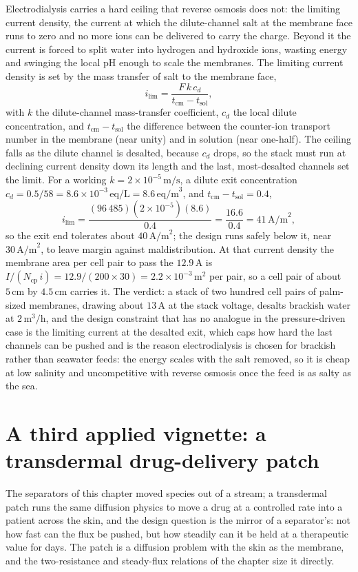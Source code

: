 Electrodialysis carries a hard ceiling that reverse osmosis does not: the
limiting current density, the current at which the dilute-channel salt at the
membrane face runs to zero and no more ions can be delivered to carry the
charge. Beyond it the current is forced to split water into hydrogen and
hydroxide ions, wasting energy and swinging the local pH enough to scale the
membranes. The limiting current density is set by the mass transfer of salt
to the membrane face,
\[
i_{\text{lim}} = \frac{F\,k\,c_d}{t_{\text{cm}} - t_{\text{sol}}},
\]
with $k$ the dilute-channel mass-transfer coefficient, $c_d$ the local
dilute concentration, and $t_{\text{cm}} - t_{\text{sol}}$ the difference
between the counter-ion transport number in the membrane (near unity) and in
solution (near one-half). The ceiling falls as the dilute channel is
desalted, because $c_d$ drops, so the stack must run at declining current
density down its length and the last, most-desalted channels set the limit.
For a working $k = 2\times 10^{-5}\,\text{m/s}$, a dilute exit concentration
$c_d = 0.5/58 = 8.6\times 10^{-3}\,\text{eq/L} = 8.6\,\text{eq/m}^3$, and
$t_{\text{cm}} - t_{\text{sol}} = 0.4$,
\[
i_{\text{lim}} = \frac{(96\,485)(2\times 10^{-5})(8.6)}{0.4} =
\frac{16.6}{0.4} = 41\,\text{A/m}^2,
\]
so the exit end tolerates about $40\,\text{A/m}^2$; the design runs safely
below it, near $30\,\text{A/m}^2$, to leave margin against maldistribution.
At that current density the membrane area per cell pair to pass the
$12.9\,\text{A}$ is $I/(N_{\text{cp}}\,i) = 12.9/(200 \times 30) = 2.2\times
10^{-3}\,\text{m}^2$ per pair, so a cell pair of about $5\,\text{cm}$ by
$4.5\,\text{cm}$ carries it. The verdict: a stack of two hundred cell pairs of
palm-sized membranes, drawing about $13\,\text{A}$ at the stack voltage,
desalts brackish water at $2\,\text{m}^3/\text{h}$, and the design constraint
that has no analogue in the pressure-driven case is the limiting current at
the desalted exit, which caps how hard the last channels can be pushed and is
the reason electrodialysis is chosen for brackish rather than seawater feeds:
the energy scales with the salt removed, so it is cheap at low salinity and
uncompetitive with reverse osmosis once the feed is as salty as the sea.

\section{A third applied vignette: a transdermal drug-delivery
patch}

The separators of this chapter moved species out of a stream; a transdermal
patch runs the same diffusion physics to move a drug at a controlled rate into
a patient across the skin, and the design question is the mirror of a
separator's: not how fast can the flux be pushed, but how steadily can it be
held at a therapeutic value for days. The patch is a diffusion problem with the
skin as the membrane, and the two-resistance and steady-flux relations of the
chapter size it directly.

